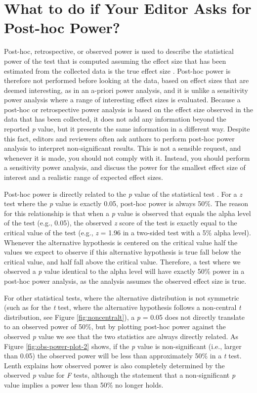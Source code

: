 \documentclass[
  oneside]{krantz}
\begin{document}
\hypertarget{posthocpower}{%
\section{What to do if Your Editor Asks for Post-hoc Power?}\label{posthocpower}}

Post-hoc, retrospective, or observed power is used to describe the statistical power of the test that is computed assuming the effect size that has been estimated from the collected data is the true effect size \citep{zumbo_note_1998, lenth_post_2007}. Post-hoc power is therefore not performed before looking at the data, based on effect sizes that are deemed interesting, as in an a-priori power analysis, and it is unlike a sensitivity power analysis where a range of interesting effect sizes is evaluated. Because a post-hoc or retrospective power analysis is based on the effect size observed in the data that has been collected, it does not add any information beyond the reported \emph{p} value, but it presents the same information in a different way. Despite this fact, editors and reviewers often ask authors to perform post-hoc power analysis to interpret non-significant results. This is not a sensible request, and whenever it is made, you should not comply with it. Instead, you should perform a sensitivity power analysis, and discuss the power for the smallest effect size of interest and a realistic range of expected effect sizes.

Post-hoc power is directly related to the \emph{p} value of the statistical test \citep{hoenig_abuse_2001}. For a \emph{z} test where the \emph{p} value is exactly 0.05, post-hoc power is always 50\%. The reason for this relationship is that when a \emph{p} value is observed that equals the alpha level of the test (e.g., 0.05), the observed \emph{z} score of the test is exactly equal to the critical value of the test (e.g., \emph{z} = 1.96 in a two-sided test with a 5\% alpha level). Whenever the alternative hypothesis is centered on the critical value half the values we expect to observe if this alternative hypothesis is true fall below the critical value, and half fall above the critical value. Therefore, a test where we observed a \emph{p} value identical to the alpha level will have exactly 50\% power in a post-hoc power analysis, as the analysis assumes the observed effect size is true.

For other statistical tests, where the alternative distribution is not symmetric (such as for the \emph{t} test, where the alternative hypothesis follows a non-central \emph{t} distribution, see Figure \ref{fig:noncentralt}), a \emph{p} = 0.05 does not directly translate to an observed power of 50\%, but by plotting post-hoc power against the observed \emph{p} value we see that the two statistics are always directly related. As Figure \ref{fig:obs-power-plot-2} shows, if the \emph{p} value is non-significant (i.e., larger than 0.05) the observed power will be less than approximately 50\% in a \emph{t} test. Lenth \citeyearpar{lenth_post_2007} explains how observed power is also completely determined by the observed \emph{p} value for \emph{F} tests, although the statement that a non-significant \emph{p} value implies a power less than 50\% no longer holds.
\end{document}
